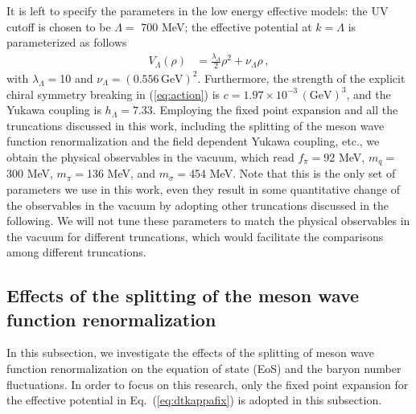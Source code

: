 \documentclass[%
reprint,
superscriptaddress,
showpacs,preprintnumbers,
 amsmath,amssymb,
 aps,
prd,
]{revtex4-1}
\def\Eq#1{Eq.~(\ref{#1})}
\def\eq#1{(\ref{#1})}
\begin{document}
It is left to specify the parameters in the low energy effective models: the UV cutoff is chosen to be $\Lambda=$ 700 MeV; the effective potential at $k=\Lambda$ is parameterized as follows
\begin{align}
  V_\Lambda(\rho)&=\frac{\lambda_\Lambda}{2}\rho^2+\nu_\Lambda\rho\,,\label{}
\end{align}
with $\lambda_\Lambda=$10 and $\nu_\Lambda=(0.556\,\mathrm{GeV})^2$. Furthermore, the strength of the explicit chiral symmetry breaking in \eq{eq:action} is $c=1.97\times 10^{-3}\,(\mathrm{GeV})^3$, and the Yukawa coupling is $h_\Lambda=7.33$. Employing the fixed point expansion and all the truncations discussed in this work, including the splitting of the meson wave function renormalization and the field dependent Yukawa coupling, etc., we obtain the physical observables in the vacuum, which read $f_\pi=$92 MeV, $m_q=$300 MeV, $m_\pi=$136 MeV, and $m_\sigma=$454 MeV. Note that this is the only set of parameters we use in this work, even they result in some quantitative change of the observables in the vacuum by adopting other truncations discussed in the following. We will not tune these parameters to match the physical observables in the vacuum for different truncations, which would facilitate the comparisons among different truncations.


\subsection{Effects of the splitting of the meson wave function renormalization}
\label{sec:splitting}

In this subsection, we investigate the effects of the splitting of meson wave function renormalization on the equation of state (EoS) and the baryon number fluctuations. In order to focus on this research, only the fixed point expansion for the effective potential in \Eq{eq:dtkappafix} is adopted in this subsection.
\end{document}
